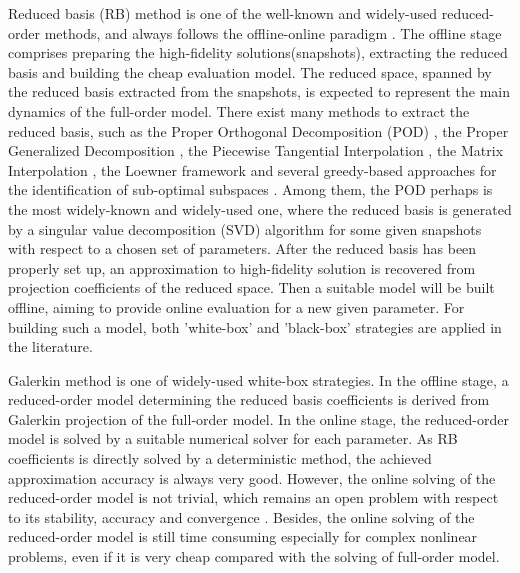 \documentclass[preprint, 10pt]{elsarticle}
\begin{document}
Reduced basis (RB) method is one of the well-known and widely-used reduced-order methods, and always follows the offline-online paradigm \cite{maday2006reduced}. The offline stage comprises preparing the high-fidelity solutions(snapshots), extracting the reduced basis and building the cheap evaluation model. The reduced space, spanned by the reduced basis  extracted from the snapshots, is expected to represent the main dynamics of the full-order model. There exist many methods to extract the reduced basis, such as the Proper Orthogonal Decomposition (POD) \cite{hesthaven2016certified,liang2002proper,quarteroni2015reduced}, the  Proper Generalized Decomposition \cite{chinesta2011short}, the Piecewise Tangential Interpolation \cite{gallivan2002model}, the Matrix Interpolation \cite{panzer2010parametric}, the Loewner framework and several greedy-based approaches for the identification of sub-optimal subspaces \cite{billaud2017dynamical, lappano2016greedy, hesthaven2014efficient}. Among them, the POD perhaps is the most widely-known and widely-used one, where the reduced basis is generated by a singular value decomposition (SVD) algorithm for some given snapshots with respect to a chosen set of parameters. After the reduced basis has been properly set up, an approximation to high-fidelity solution is recovered from projection coefficients of the reduced space. Then a suitable model will be built offline, aiming to provide online evaluation for a new given parameter.
For building such a model, both 'white-box' and 'black-box' strategies are applied in the literature.

Galerkin method \cite{rowley2004model, wang2020recurrent, deane1991low} is one of widely-used white-box strategies. In the offline stage,
a reduced-order model determining the reduced basis coefficients is derived from Galerkin projection of the full-order model. In the online stage, the reduced-order model is solved by a suitable numerical solver for each parameter.
As RB coefficients is directly solved by a deterministic method, the achieved approximation accuracy is always very good.
However, the online solving of the reduced-order model is not trivial, which remains an open problem with respect to its stability, accuracy and convergence \cite{huang2018challenges, iollo2000stability, rowley2004model}. Besides, the online solving of the reduced-order model is still time consuming especially for complex nonlinear problems, even if it is very cheap compared with the solving of full-order model.

\end{document}
